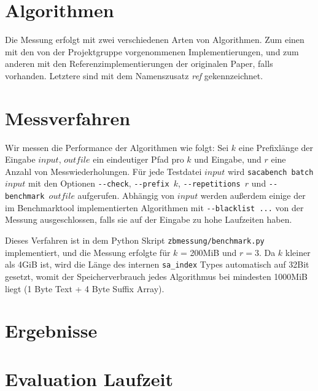\section{Algorithmen}

Die Messung erfolgt mit zwei verschiedenen Arten von Algorithmen. Zum einen mit den von der Projektgruppe vorgenommenen Implementierungen, und zum anderen mit den Referenzimplementierungen der originalen Paper, falls vorhanden. Letztere sind mit dem Namenszusatz \textit{ref} gekennzeichnet.

\section{Messverfahren}

Wir messen die Performance der Algorithmen wie folgt: Sei $k$ eine Prefixlänge der Eingabe $input$, $outfile$ ein eindeutiger Pfad pro $k$ und Eingabe, und $r$ eine Anzahl von Messwiederholungen. Für jede Testdatei $input$ wird \texttt{sacabench batch $input$} mit den Optionen \texttt{-{}-check}, \texttt{-{}-prefix $k$}, \texttt{-{}-repetitions $r$} und \texttt{-{}-benchmark $outfile$} aufgerufen. Abhängig von $input$ werden außerdem einige der im Benchmarktool implementierten Algorithmen mit \texttt{-{}-blacklist ...} von der Messung ausgeschlossen, falls sie auf der Eingabe zu hohe Laufzeiten haben.


Dieses Verfahren ist in dem Python Skript \texttt{zbmessung/benchmark.py} implementiert, und die Messung erfolgte für $k$ = 200MiB und $r = 3$. Da $k$ kleiner als 4GiB ist, wird die Länge des internen \texttt{sa\_index} Types automatisch auf 32Bit gesetzt, womit der Speicherverbrauch jedes Algorithmus bei mindesten 1000MiB liegt (1 Byte Text + 4 Byte Suffix Array).

\section{Ergebnisse}




\section{Evaluation Laufzeit}

